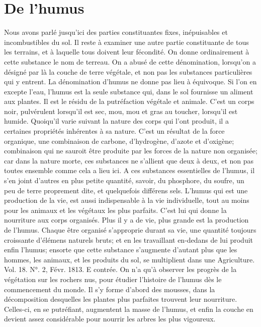 \section{De l'humus}
Nous avons parlé jusqu'ici des parties constituantes fixes, inépuisables et incombustibles du sol. Il reste à examiner une autre partie constituante de tous les terrains, et à laquelle tous doivent leur fécondité. On donne ordinairement à cette substance le nom de terreau. On a abusé de cette dénomination, lorsqu'on a désigné par là la couche de terre végétale, et non pas les substances particulières qui y entrent. La dénomination d'humus ne donne pas lieu à équivoque.
Si l'on en excepte l'eau, l'humus est la seule substance qui, dans le sol fournisse un aliment aux plantes. Il est le résidu de la putréfaction végétale et animale. C'est un corps noir, pulvérulent lorsqu'il est sec, mou,\setcounter{page}{57} mou et gras au toucher, lorsqu'il est humide. Quoiqu'il varie suivant la nature des corps qui l'ont produit, il a certaines propriétés inhérentes à sa nature. C'est un résultat de la force organique, une combinaison de carbone, d'hydrogène, d'azote et d'oxigène; combinaison qui ne sauroit être produite par les forces de la nature non organisée; car dans la nature morte, ces substances ne s'allient que deux à deux, et non pas toutes ensemble comme cela a lieu ici. A ces substances essentielles de l'humus, il s'en joint d'autres en plus petite quantité, savoir, du phosphore, du soufre, un peu de terre proprement dite, et quelquefois différens sels. L'humus qui est une production de la vie, est aussi indispensable à la vie individuelle, tout au moins pour les animaux et les végétaux les plus parfaits. C'est lui qui donne la nourriture aux corps organisés. Plus il y a de vie, plus grande est la production de l'humus. Chaque être organisé s'approprie durant sa vie, une quantité toujours croissante d'élémens naturels bruts; et en les travaillant en-dedans de lui produit enfin l'humus; ensorte que cette substance s'augmente d'autant plus que les hommes, les animaux, et les produits du sol, se multiplient dans une
Agriculture. Vol. 18. N°. 2, Févr. 1813. E\setcounter{page}{58} contrée. On n’a qu’à observer les progrès de la végétation sur les rochers nus, pour étudier l’histoire de l’humus dès le commencement du monde. Il s’y forme d’abord des mousses, dans la décomposition desquelles les plantes plus parfaites trouvent leur nourriture. Celles-ci, en se putréfiant, augmentent la masse de l’humus, et enfin la couche en devient assez considérable pour nourrir les arbres les plus vigoureux.

